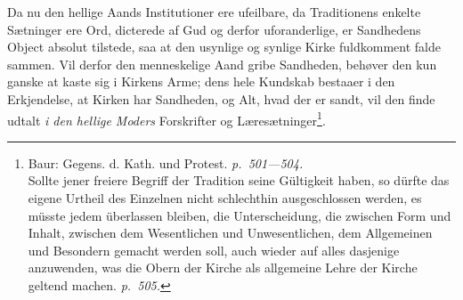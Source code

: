 \documentclass[12pt]{book}
\begin{document}
Da nu den hellige Aands Institutioner ere ufeilbare, da Traditionens enkelte
Sætninger ere Ord, dicterede af Gud og derfor uforanderlige, er Sandhedens Object
absolut tilstede, saa at den usynlige og synlige Kirke fuldkomment falde sammen.
Vil derfor den menneskelige Aand gribe Sandheden, behøver den kun ganske at kaste
sig i Kirkens Arme; dens hele Kundskab bestaaer i den Erkjendelse, at Kirken har
Sandheden, og Alt, hvad der er sandt, vil den finde udtalt \emph{i den hellige
Moders} Forskrifter og Læresætninger\footnote{Baur: Gegens. d. Kath. und Protest.
\textit{p.\ 501---504.}\\
Sollte jener freiere Begriff der Tradition seine Gültigkeit haben, so dürfte das
eigene Urtheil des Einzelnen nicht schlechthin ausgeschlossen werden, es müsste
jedem überlassen bleiben, die Unterscheidung, die zwischen Form und Inhalt,
zwischen dem Wesentlichen und Unwesentlichen, dem Allgemeinen und Besondern
gemacht werden soll, auch wieder auf alles dasjenige anzuwenden, was die Obern
der Kirche als allgemeine Lehre der Kirche geltend machen. \textit{p.\ 505.}}.
\end{document}
